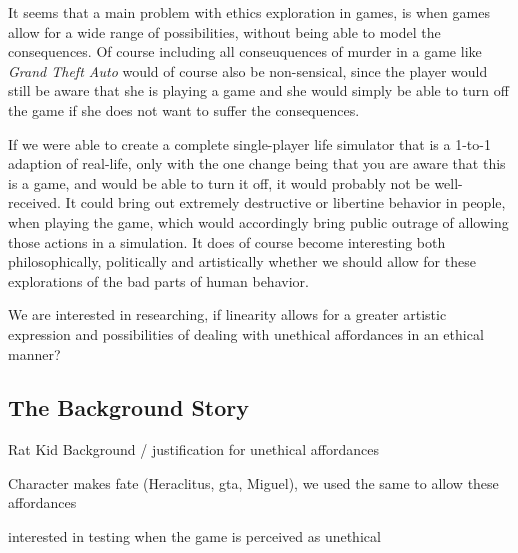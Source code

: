 It seems that a main problem with ethics exploration in games, is when games allow for a wide range of possibilities, without being able to model the consequences. Of course including all conseuquences of murder in a game like \textit{Grand Theft Auto} would of course also be non-sensical, since the player would still be aware that she is playing a game and she would simply be able to turn off the game if she does not want to suffer the consequences.\

If we were able to create a complete single-player life simulator that is a 1-to-1 adaption of real-life, only with the one change being that you are aware that this is a game, and would be able to turn it off, it would probably not be well-received. It could bring out extremely destructive or libertine behavior in people, when playing the game, which would accordingly bring public outrage of allowing those actions in a simulation. It does of course become interesting both philosophically, politically and artistically whether we should allow for these explorations of the bad parts of human behavior.\

We are interested in researching, if linearity allows for a greater artistic expression and possibilities of dealing with unethical affordances in an ethical manner? \

\subsection{The Background Story}

Rat Kid Background / justification for unethical affordances\

Character makes fate (Heraclitus, gta, Miguel), we used the same to allow these affordances \

interested in testing when the game is perceived as unethical\
